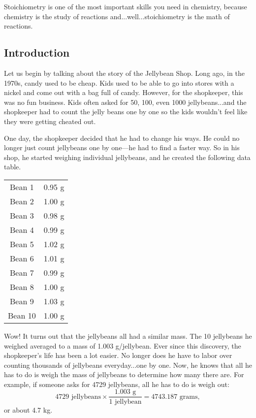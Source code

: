 Stoichiometry is one of the most important skills you need in chemistry, because chemistry is the study of reactions and...well...stoichiometry is the math of reactions. 

\subsection{Introduction}
Let us begin by talking about the story of the Jellybean Shop. Long ago, in the 1970s, candy used to be cheap. Kids used to be able to go into stores with a nickel and come out with a bag full of candy. However, for the shopkeeper, this was no fun business. Kids often asked for 50, 100, even 1000 jellybeans...and the shopkeeper had to count the jelly beans one by one so the kids wouldn't feel like they were getting cheated out. 

One day, the shopkeeper decided that he had to change his ways. He could no longer just count jellybeans one by one---he had to find a faster way. So in his shop, he started weighing individual jellybeans, and he created the following data table.
\begin{center}
\begin{tabular}{|c|c|}
    \hline
     Bean 1 & 0.95 g \\
     Bean 2 & 1.00 g \\
     Bean 3 & 0.98 g \\
     Bean 4 & 0.99 g \\
     Bean 5 & 1.02 g \\
     Bean 6 & 1.01 g \\
     Bean 7 & 0.99 g \\
     Bean 8 & 1.00 g \\
     Bean 9 & 1.03 g \\
     Bean 10 & 1.00 g \\
     \hline
\end{tabular} 
\end{center}
Wow! It turns out that the jellybeans all had a similar mass. The 10 jellybeans he weighed averaged to a mass of 1.003 g/jellybean. Ever since this discovery, the shopkeeper's life has been a lot easier. No longer does he have to labor over counting thousands of jellybeans everyday...one by one. Now, he knows that all he has to do is weigh the mass of jellybeans to determine how many there are. For example, if someone asks for 4729 jellybeans, all he has to do is weigh out:
$$4729 \text{ jellybeans} \times \frac{1.003 \text{ g}}{1 \text{ jellybean}} = \boxed{4743.187 \text{ grams}},$$
or about 4.7 kg. 

